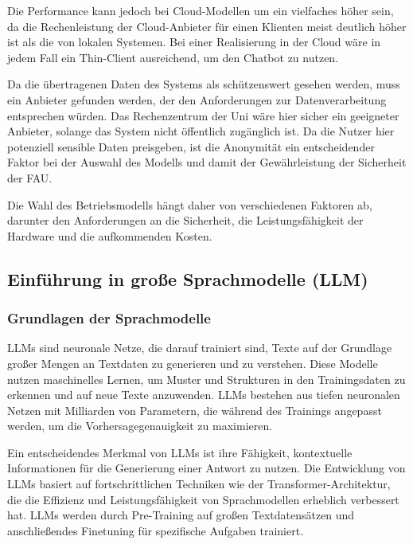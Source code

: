 \documentclass[german,report]{i1thesis}
\begin{document}
Die Performance kann jedoch bei Cloud-Modellen um ein vielfaches höher sein, da die Rechenleistung der Cloud-Anbieter für einen Klienten meist deutlich höher ist als die von lokalen Systemen.
Bei einer Realisierung in der Cloud wäre in jedem Fall ein Thin-Client ausreichend, um den Chatbot zu nutzen.

Da die übertragenen Daten des Systems als schützenswert gesehen werden, muss ein Anbieter gefunden werden, der den Anforderungen zur Datenverarbeitung entsprechen würden.
Das Rechenzentrum der Uni \autocite{rrze} wäre hier sicher ein geeigneter Anbieter, solange das System nicht öffentlich zugänglich ist.
Da die Nutzer hier potenziell sensible Daten preisgeben, ist die Anonymität ein entscheidender Faktor bei der Auswahl des Modells und damit der Gewährleistung der Sicherheit der \ac{FAU}.

Die Wahl des Betriebsmodells hängt daher von verschiedenen Faktoren ab, darunter den Anforderungen an die Sicherheit, die Leistungsfähigkeit der Hardware und die aufkommenden Kosten.




\subsection{Einführung in große Sprachmodelle (LLM)}

\subsubsection{Grundlagen der Sprachmodelle}

\acfp{LLM} sind neuronale Netze, die darauf trainiert sind, Texte auf der Grundlage großer Mengen an Textdaten zu generieren und zu verstehen.
Diese Modelle nutzen maschinelles Lernen, um Muster und Strukturen in den Trainingsdaten zu erkennen und auf neue Texte anzuwenden.
\acp{LLM} bestehen aus tiefen neuronalen Netzen mit Milliarden von Parametern, die während des Trainings angepasst werden, um die Vorhersagegenauigkeit zu maximieren.

Ein entscheidendes Merkmal von \acp{LLM} ist ihre Fähigkeit, kontextuelle Informationen für die Generierung einer Antwort zu nutzen.
Die Entwicklung von \acp{LLM} basiert auf fortschrittlichen Techniken wie der Transformer-Architektur, die die Effizienz und Leistungsfähigkeit von Sprachmodellen erheblich verbessert hat.
\acp{LLM} werden durch Pre-Training auf großen Textdatensätzen und anschließendes Finetuning für spezifische Aufgaben trainiert.
\end{document}
